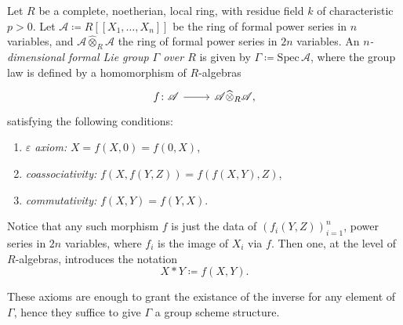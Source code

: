 \documentclass[../Main]{subfiles}
\begin{document}
\begin{defn}
	Let $R$ be a complete, noetherian, local ring,
	with residue field $k$ of characteristic $p > 0$.
	Let $\mathscr{A} \coloneqq R [\![ X_1, \ldots, X_{ n } ]\!]$
	be the ring of formal power series in $n$ variables,
	and $\mathscr{A} \widehat{\otimes}_R \mathscr{A}$ the ring of formal power series 
	in $2n$ variables.
	An {\em $n$-dimensional formal Lie group $\Gamma$ over $R$} is 
	given by $\Gamma \coloneqq \mathrm{Spec}\, \mathscr{A}$,
	where the group law is defined by a homomorphism of $R$-algebras 
	\begin{equation}
	\begin{tikzcd}[row sep = 0ex
		,/tikz/column 1/.append style={anchor=base east}
		,/tikz/column 2/.append style={anchor=base west}]
		f\colon \mathscr{A} \arrow[r, "", rightarrow] &
		\mathscr{A} \widehat{\otimes}_R \mathscr{A}
	,\end{tikzcd}
	\end{equation} 
	satisfying the following conditions:
	\begin{enumerate}
		\item {\em $\varepsilon$ axiom:} $X = f(X,0) = f(0,X)$,
		\item {\em coassociativity:} $f(X, f(Y,Z)) = f(f(X,Y), Z)$,
		\item {\em commutativity:} $f(X,Y) = f(Y,X)$.
	\end{enumerate}
	Notice that any such morphism $f$ is just the data of 
	$\left( f_i(Y,Z) \right)_{i=1}^n$, power series in $2n$ variables, where
	$f_i$ is the image of $X_i$ via $f$.
	Then one, at the level of $R$-algebras, introduces the notation
	\begin{equation}
		X \ast Y \coloneqq f(X,Y)
	.\end{equation} 
\end{defn}

\begin{rem}[]
	These axioms are enough to grant the existance of the inverse for any element of $\Gamma$,
	hence they suffice to give $\Gamma$ a group scheme structure.
\end{rem}
\end{document}
